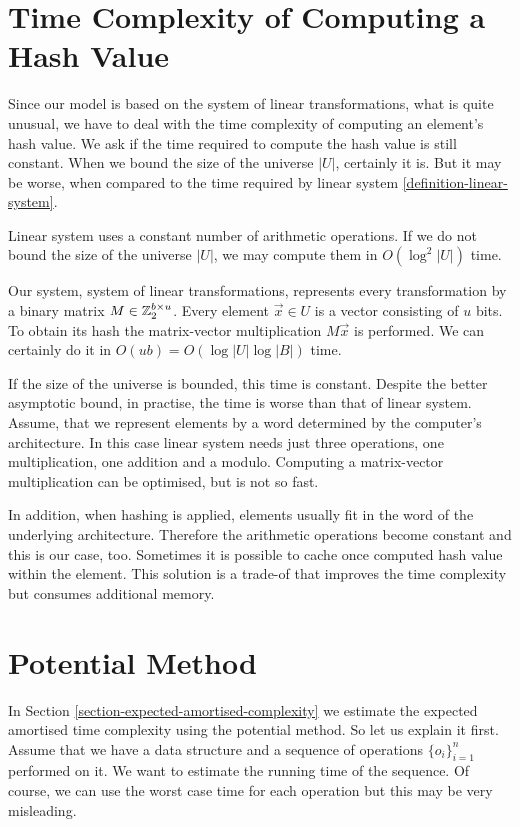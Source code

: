 \section{Time Complexity of Computing a Hash Value}
\label{section-time-complexity}
Since our model is based on the system of linear transformations, what is quite unusual, we have to deal with the time complexity of computing an element's hash value. We ask if the time required to compute the hash value is still constant. When we bound the size of the universe $|U|$, certainly it is. But it may be worse, when compared to the time required by linear system \ref{definition-linear-system}. 

Linear system uses a constant number of arithmetic operations. If we do not bound the size of the universe $|U|$, we may compute them in $O(\log^2 |U|)$ time. 

Our system, system of linear transformations, represents every transformation by a binary matrix $M \in \mathbb{Z}_{2}^{b \times u}$. Every element $\vec{x} \in U$ is a vector consisting of $u$ bits. To obtain its hash the matrix-vector multiplication $M\vec{x}$ is performed. We can certainly do it in $O(u b) = O(\log |U| \log |B|)$ time. 

If the size of the universe is bounded, this time is constant. Despite the better asymptotic bound, in practise, the time is worse than that of linear system. Assume, that we represent elements by a word determined by the computer's architecture. In this case linear system needs just three operations, one multiplication, one addition and a modulo. Computing a matrix-vector multiplication can be optimised, but is not so fast. 

In addition, when hashing is applied, elements usually fit in the word of the underlying architecture. Therefore the arithmetic operations become constant and this is our case, too. Sometimes it is possible to cache once computed hash value within the element. This solution is a trade-of that improves the time complexity but consumes additional memory.

\section{Potential Method} 
In Section \ref{section-expected-amortised-complexity} we estimate the expected amortised time complexity using the potential method. So let us explain it first. Assume that we have a data structure and a sequence of operations $\{o_i\}_{i = 1}^{n}$ performed on it. We want to estimate the running time of the sequence. Of course, we can use the worst case time for each operation but this may be very misleading. 

